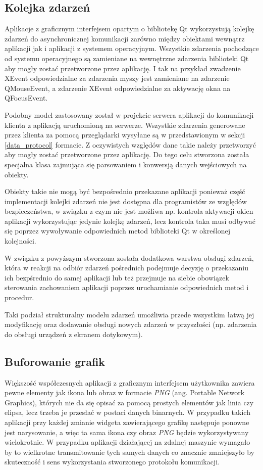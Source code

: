 \subsection{Kolejka zdarzeń}
Aplikacje z graficznym interfejsem opartym o bibliotekę Qt wykorzystują kolejkę zdarzeń do asynchronicznej komunikacji zarówno między obiektami wewnątrz aplikacji jak i aplikacji z systemem operacyjnym. Wszystkie zdarzenia pochodzące od systemu operacyjnego są zamieniane na wewnętrzne zdarzenia biblioteki Qt aby mogły zostać przetworzone przez aplikację. I tak na przykład zwadzenie XEvent odpowiedzialne za zdarzenia myszy jest zamieniane na zdarzenie QMouseEvent, a zdarzenie XEvent odpowiedzialne za aktywację okna na QFocusEvent. 

Podobny model zastosowany został w projekcie serwera aplikacji do komunikacji klienta z aplikacją uruchomioną na serwerze. Wszystkie zdarzenia generowane przez klienta za pomocą przeglądarki wysyłane są w przedstawionym w sekcji \ref{data_protocol} formacie. Z oczywistych względów dane takie należy przetworzyć aby mogły zostać przetworzone przez aplikację. Do tego celu stworzona została specjalna klasa zajmująca się parsowaniem i konwersją danych wejściowych na obiekty. 

Obiekty takie nie mogą być bezpośrednio przekazane aplikacji ponieważ część implementacji kolejki zdarzeń nie jest dostępna dla programistów ze względów bezpieczeństwa, w związku z czym nie jest możliwa np. kontrola aktywacji okien aplikacji wykorzystując jedynie kolejkę zdarzeń, lecz kontrola taka musi odbywać się poprzez wywoływanie odpowiednich metod biblioteki Qt w określonej kolejności.

W związku z powyższym stworzona została dodatkowa warstwa obsługi zdarzeń, która w reakcji na odbiór zdarzeń pośrednich podejmuje decyzję o przekazaniu ich bezpśrednio do samej aplikacji lub też przejmuje na siebie obowiązek sterowania zachowaniem aplikacji poprzez uruchamianie odpowiednich metod i procedur. 

Taki podział strukturalny modelu zdarzeń umożliwia przede wszystkim łatwą jej modyfikację oraz dodawanie obsługi nowych zdarzeń w przyszłości (np. zdarzenia do obsługi urządzeń z ekranem dotykowym).

\subsection{Buforowanie grafik}
Większość współczesnych aplikacji z graficznym interfejsem użytkownika zawiera pewne elementy jak ikona lub obraz w formacie \emph{PNG} (ang. Portable Network Graphics), których nie da się opisać za pomocą prostych elementów jak linia czy elipsa, lecz trzeba je przesłać w postaci danych binarnych. W przypadku takich aplikacji przy każdej zmianie widgeta zawierającego grafikę następuje ponowne jest narysowanie, a więc ta sama ikona czy obraz \emph{PNG} będzie wykorzystywany wielokrotnie. W przypadku aplikacji działającej na zdalnej maszynie wymagało by to wielkrotne transmitowanie tych samych danych co znacznie zmniejszyło by skuteczność i sens wykorzystania stworzonego protokołu komunikacji.

